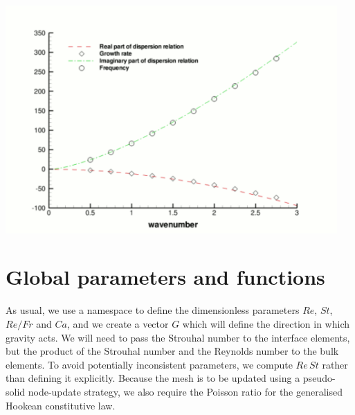  
\begin{DoxyImage}
\includegraphics[width=0.95\textwidth]{single_layer_code_validation}
\end{DoxyImage}




 

\hypertarget{index_namespace}{}\section{Global parameters and functions}\label{index_namespace}
As usual, we use a namespace to define the dimensionless parameters $ Re $, $ St $, $ Re/Fr $ and $ Ca $, and we create a vector $ G $ which will define the direction in which gravity acts. We will need to pass the Strouhal number to the interface elements, but the product of the Strouhal number and the Reynolds number to the bulk elements. To avoid potentially inconsistent parameters, we compute $ Re \, St $ rather than defining it explicitly. Because the mesh is to be updated using a pseudo-\/solid node-\/update strategy, we also require the Poisson ratio for the generalised Hookean constitutive law.

